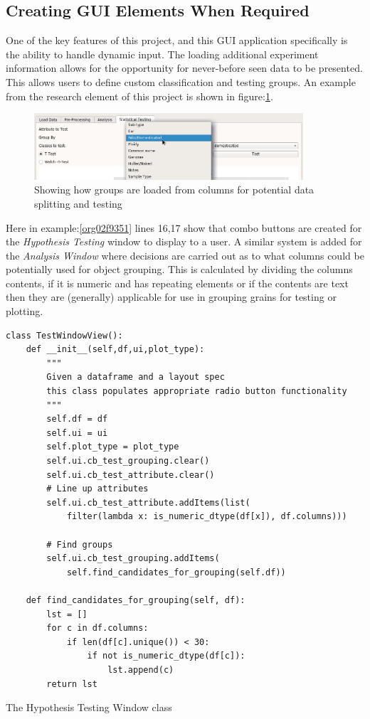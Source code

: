 \documentclass[11pt]{report}
\begin{document}
\subsection{Creating GUI Elements When Required}
\label{sec:org429bf48}

One of the key features of this project, and this GUI application specifically is the ability to handle dynamic input. The loading additional experiment information allows for the opportunity for never-before seen data to be presented. This allows users to define custom classification and testing groups. An example from the research element of this project is shown in figure:\ref{fig:org049047c}.

\begin{figure}[htbp]
\centering
\includegraphics[width=10cm]{./images/dynamicselection.png}
\caption{\label{fig:org049047c}
Showing how groups are loaded from columns for potential data splitting and testing}
\end{figure}

Here in example:\ref{org02f9351} lines 16,17 show that combo buttons are created for the \emph{Hypothesis Testing} window to display to a user. A similar system is added for the \emph{Analysis Window} where decisions are carried out as to what columns could be potentially used for object grouping. This is calculated by dividing the columns contents, if it is numeric and has repeating elements or if the contents are text then they are (generally) applicable for use in grouping grains for testing or plotting.

\begin{listing}[htbp]
\begin{verbatim}
class TestWindowView():
    def __init__(self,df,ui,plot_type):
        """
        Given a dataframe and a layout spec
        this class populates appropriate radio button functionality
        """
        self.df = df
        self.ui = ui
        self.plot_type = plot_type
        self.ui.cb_test_grouping.clear()
        self.ui.cb_test_attribute.clear()
        # Line up attributes
        self.ui.cb_test_attribute.addItems(list(
            filter(lambda x: is_numeric_dtype(df[x]), df.columns)))

        # Find groups
        self.ui.cb_test_grouping.addItems(
            self.find_candidates_for_grouping(self.df))

    def find_candidates_for_grouping(self, df):
        lst = []
        for c in df.columns:
            if len(df[c].unique()) < 30:
                if not is_numeric_dtype(df[c]):
                    lst.append(c)
        return lst
\end{verbatim}
\caption{\label{org02f9351}
The Hypothesis Testing Window class}
\end{listing}
\end{document}
